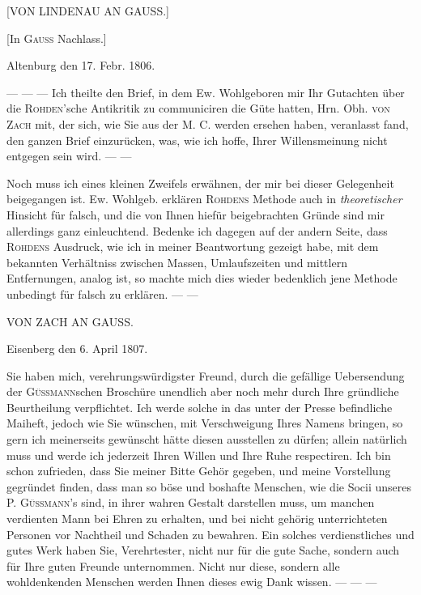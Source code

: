 \par\bigskip
{}
\hypertarget{native-491-lindenau}{}
\label{native-491-lindenau}
\begin{center}
[VON LINDENAU AN GAUSS.]

[In \textsc{Gauss} Nachlass.]
\end{center}

\begin{flushright}Altenburg den 17. Febr. 1806.\end{flushright}

--- --- --- Ich theilte den Brief, in dem Ew. Wohlgeboren mir Ihr Gutachten über die \textsc{Rohden}'sche Antikritik zu communiciren die Güte hatten, Hrn. Obh. \textsc{von Zach} mit, der sich, wie Sie aus der M. C. werden ersehen haben, veranlasst fand, den ganzen Brief einzurücken, was, wie ich hoffe, Ihrer Willensmeinung nicht entgegen sein wird. --- ---

Noch muss ich eines kleinen Zweifels erwähnen, der mir bei dieser Gelegenheit beigegangen ist. Ew. Wohlgeb. erklären \textsc{Rohdens} Methode auch in \emph{theoretischer} Hinsicht für falsch, und die von Ihnen hiefür beigebrachten Gründe sind mir allerdings ganz einleuchtend. Bedenke ich dagegen auf der andern Seite, dass \textsc{Rohdens} Ausdruck, wie ich in meiner Beantwortung gezeigt habe, mit dem bekannten Verhältniss zwischen Massen, Umlaufszeiten und mittlern Entfernungen, analog ist, so machte mich dies wieder bedenklich jene Methode unbedingt für falsch zu erklären. --- ---

\par\bigskip
{}
\hypertarget{native-491-zach}{}
\label{native-491-zach}
\begin{center}
VON ZACH AN GAUSS.
\end{center}

\begin{flushright}Eisenberg den 6. April 1807.\end{flushright}

Sie haben mich, verehrungswürdigster Freund, durch die gefällige Uebersendung der \textsc{Güssmann}schen Broschüre unendlich aber noch mehr durch Ihre gründliche Beurtheilung verpflichtet. Ich werde solche in das unter der Presse befindliche Maiheft, jedoch wie Sie wünschen, mit Verschweigung Ihres Namens bringen, so gern ich meinerseits gewünscht hätte diesen ausstellen zu dürfen; allein natürlich muss und werde ich jederzeit Ihren Willen und Ihre Ruhe respectiren. Ich bin schon zufrieden, dass Sie meiner Bitte Gehör gegeben, und meine Vorstellung gegründet finden, dass man so böse und boshafte Menschen, wie die Socii unseres P. \textsc{Güssmann}'s sind, in ihrer wahren Gestalt darstellen muss, um manchen verdienten Mann bei Ehren zu erhalten, und bei nicht gehörig unterrichteten Personen vor Nachtheil und Schaden zu bewahren. Ein solches verdienstliches und gutes Werk haben Sie, Verehrtester, nicht nur für die gute Sache, sondern auch für Ihre guten Freunde unternommen. Nicht nur diese, sondern alle wohldenkenden Menschen werden Ihnen dieses ewig Dank wissen. --- --- ---

